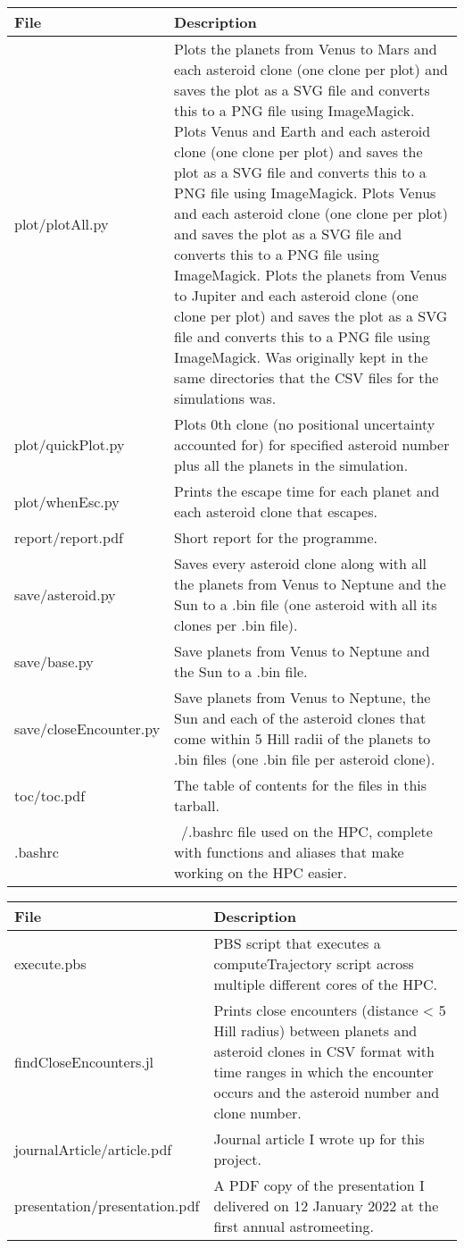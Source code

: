 \documentclass[12pt,a4paper]{article}
\begin{document}
\begin{tabular}{|m{15em}|m{30em}|}
    \hline
    File & Description \\\hline
    plot/plotAll.py & Plots the planets from Venus to Mars and each asteroid clone (one clone per plot) and saves the plot as a SVG file and converts this to a PNG file using ImageMagick. Plots Venus and Earth and each asteroid clone (one clone per plot) and saves the plot as a SVG file and converts this to a PNG file using ImageMagick. Plots Venus and each asteroid clone (one clone per plot) and saves the plot as a SVG file and converts this to a PNG file using ImageMagick. Plots the planets from Venus to Jupiter and each asteroid clone (one clone per plot) and saves the plot as a SVG file and converts this to a PNG file using ImageMagick. Was originally kept in the same directories that the CSV files for the simulations was.\\\hline
    plot/quickPlot.py & Plots 0th clone (no positional uncertainty accounted for) for specified asteroid number plus all the planets in the simulation.\\\hline
    plot/whenEsc.py & Prints the escape time for each planet and each asteroid clone that escapes. \\\hline
    report/report.pdf & Short report for the programme. \\\hline
    save/asteroid.py & Saves every asteroid clone along with all the planets from Venus to Neptune and the Sun to a .bin file (one asteroid with all its clones per .bin file). \\\hline
    save/base.py & Save planets from Venus to Neptune and the Sun to a .bin file. \\\hline
    save/closeEncounter.py & Save planets from Venus to Neptune, the Sun and each of the asteroid clones that come within 5 Hill radii of the planets to .bin files (one .bin file per asteroid clone). \\\hline
    toc/toc.pdf & The table of contents for the files in this tarball.\\\hline
    .bashrc & ~/.bashrc file used on the HPC, complete with functions and aliases that make working on the HPC easier. \\\hline
\end{tabular}

\begin{tabular}{|m{15em}|m{30em}|}
    \hline
    File & Description \\\hline
    execute.pbs & PBS script that executes a computeTrajectory script across multiple different cores of the HPC. \\\hline
    findCloseEncounters.jl & Prints close encounters (distance < 5 Hill radius) between planets and asteroid clones in CSV format with time ranges in which the encounter occurs and the asteroid number and clone number. \\\hline
    journalArticle/article.pdf & Journal article I wrote up for this project. \\\hline
    presentation/presentation.pdf & A PDF copy of the presentation I delivered on 12 January 2022 at the first annual astromeeting. \\\hline
\end{tabular}
\end{document}
